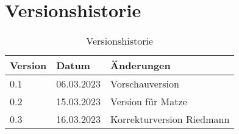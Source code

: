 \section*{Versionshistorie}

\begin{table}[ht]
  \centering
  \begin{tabular}{|l|l|l|}
    \hline
    \textbf{Version} & \textbf{Datum} & \textbf{Änderungen}       \\ \hline
    0.1              & 06.03.2023     & Vorschauversion           \\ \hline
    0.2              & 15.03.2023     & Version für Matze         \\ \hline
    0.3              & 16.03.2023     & Korrekturversion Riedmann \\ \hline
  \end{tabular}
  \caption{Versionshistorie}
  \label{tab:versionshistorie}
\end{table}
